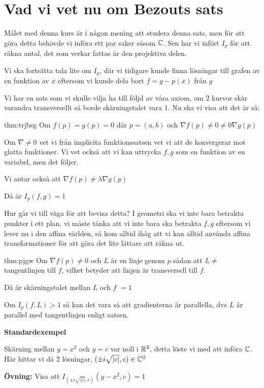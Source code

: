 \section{Vad vi vet nu om Bezouts sats}\par
\noindent Målet med denna kurs är i någon mening att studera denna sats, men för att göra detta behövde vi införa ett par saker såsom $\mathbb{C}$. Sen har vi infört $I_p$ för att räkna antal, det som verkar fattas är den projektiva delen.
\par\bigskip
\noindent Vi ska fortsätta tala lite om $I_p$, där vi tidigare kunde finna lösningar till grafen av en funktion av $x$ eftersom vi kunde dela bort $f = y-p(x)$ från $g$
\par\bigskip
\noindent Vi har en sats som vi skulle vilja ha till följd av våra axiom, om 2 kurvor skär varandra transversellt så borde skärningstalet vara 1. Nu ska vi visa att det är så:
\par\bigskip
\begin{theo}[$I_p=1$ för transversella skärningar]{thm:trjbsg}
  Om $f(p) = g(p)=0$ där $p=(a,b)$ och $\nabla f(p)\neq0\neq0\nabla g(p)$
  \par\bigskip
  \noindent Om $\nabla\neq0$ vet vi från implicita funktionssatsen vet vi att de konvergerar mot glatta funktioner. Vi vet också att vi kan uttrycka $f,g$ som en funktion av en variabel, men det följer.\par
  \noindent Vi antar också att $\nabla f(p)\neq\lambda\nabla g(p)$
  \par\bigskip
  \noindent Då är $I_p(f,g)=1$
\end{theo}
\par\bigskip
\noindent Hur går vi till väga för att bevisa detta? I geometri ska vi inte bara betrakta punkter i ett plan, vi måste tänka att vi inte bara ska betrakta $f,g$ eftersom vi lever nu i den affina världen, så kom alltid ihåg att vi kan alltid använda affina transformationer för att göra det lite lättare att räkna ut.
\par\bigskip
\begin{theo}[Följdsats]{thm:pjgw}
  Om $\nabla f(p)\neq0$ och $L$ är en linje genom $p$ sådan att $L\neq$ tangentlinjen till $f$, vilket betyder att linjen är transversell till $f$.
  \par\bigskip
  \noindent Då är skärningstalet mellan $L$ och $f$ $=1$
  \par\bigskip
  \noindent Om $I_p(f,L)>1$ så kan det vara så att gradienterna är parallella, dvs $L$ är parallel med tangentlinjen enligt satsen.
\end{theo}
\par\bigskip
\noindent\textbf{Standardexempel}
\par
\noindent Skärning mellan $y=x^2$ och $y=c$ var noll i $\mathbb{R}^2$, detta löste vi med att införa $\mathbb{C}$. Här hittar vi då 2 lösningar, $(\pm i\sqrt{\left|c\right|},c)\in\mathbb{C}^2$
\par\bigskip
\noindent\textbf{Övning:} Visa att $I_{(\pm i\sqrt{\left|c\right|},c)}(y-x^2,c)=1$
\newpage
